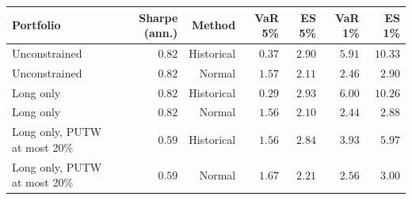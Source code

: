 \begin{tabular}{lrrrrrr}
\toprule
Portfolio & Sharpe (ann.) & Method & VaR 5\% & ES 5\% & VaR 1\% & ES 1\% \\
\midrule
Unconstrained & $0.82$ & Historical & $0.37$ & $2.90$ & $5.91$ & $10.33$ \\
Unconstrained & $0.82$ & Normal & $1.57$ & $2.11$ & $2.46$ & $2.90$ \\
Long only & $0.82$ & Historical & $0.29$ & $2.93$ & $6.00$ & $10.26$ \\
Long only & $0.82$ & Normal & $1.56$ & $2.10$ & $2.44$ & $2.88$ \\
Long only, PUTW at most 20\% & $0.59$ & Historical & $1.56$ & $2.84$ & $3.93$ & $5.97$ \\
Long only, PUTW at most 20\% & $0.59$ & Normal & $1.67$ & $2.21$ & $2.56$ & $3.00$ \\
\bottomrule
\end{tabular}
